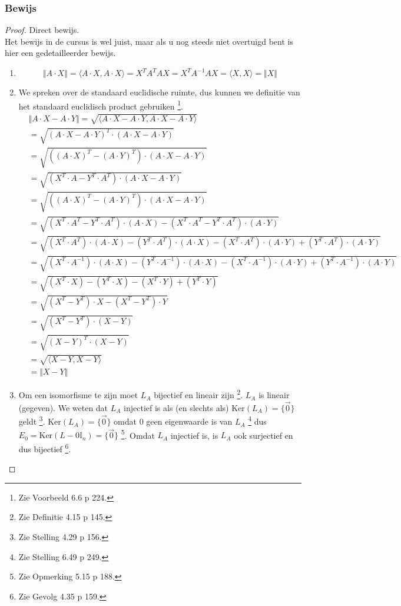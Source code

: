 \documentclass[lineaire_algebra_oplossingen.tex]{subfiles}
\begin{document}
\subsubsection*{Bewijs}
\begin{proof}
Direct bewijs.\\
Het bewijs in de cursus is wel juist, maar als u nog steeds niet overtuigd bent is hier een gedetailleerder bewijs.
\begin{enumerate}
\item
\[
\Vert A \cdot X \Vert = \langle A\cdot X, A\cdot X\rangle = X^TA^TAX =  X^TA^{-1}AX =\langle X,X\rangle = \Vert X\Vert
\]

\item
We spreken over de standaard euclidische ruimte, dus kunnen we definitie van het standaard euclidisch product gebruiken \footnote{Zie Voorbeeld 6.6 p 224.}.
\begin{align*}
&\Vert A\cdot X - A\cdot Y \Vert
= \sqrt{\langle  A\cdot X - A\cdot Y ,  A\cdot X - A\cdot Y \rangle} \\
&= \sqrt{(A\cdot X - A\cdot Y)^T\cdot(A\cdot X - A\cdot Y)} \\
&= \sqrt{((A\cdot X)^T - (A\cdot Y)^T)\cdot(A\cdot X - A\cdot Y)} \\
&= \sqrt{(X^T\cdot A - Y^T\cdot A^T)\cdot(A\cdot X - A\cdot Y)} \\
&= \sqrt{((A\cdot X)^T - (A\cdot Y)^T)\cdot(A\cdot X - A\cdot Y)}  \\
&= \sqrt{(X^T\cdot A^T - Y^T\cdot A^T)\cdot(A\cdot X) - (X^T\cdot A^T - Y^T\cdot A^T)\cdot (A\cdot Y)} \\
&= \sqrt{(X^T\cdot A^T)\cdot(A\cdot X) - (Y^T\cdot A^T)\cdot(A\cdot X) - (X^T\cdot A^T)\cdot (A\cdot Y) + (Y^T\cdot A^T)\cdot (A\cdot Y)} \\
&= \sqrt{(X^T\cdot A^{-1})\cdot(A\cdot X) - (Y^T\cdot A^{-1})\cdot(A\cdot X) - (X^T\cdot A^{-1})\cdot (A\cdot Y) + (Y^T\cdot A^{-1})\cdot (A\cdot Y)} \\
&= \sqrt{(X^T\cdot X) - (Y^T\cdot X) - (X^T\cdot Y) + (Y^T\cdot Y)} \\
&= \sqrt{(X^T- Y^T)\cdot X - (X^T - Y^T) \cdot Y} \\
&= \sqrt{(X^T- Y^T)\cdot (X - Y)} \\
&= \sqrt{(X- Y)^T\cdot (X - Y)} \\
&= \sqrt{\langle X-Y , X-Y \rangle} \\
&= \Vert X-Y\Vert
\end{align*}

\item
Om een isomorfisme te zijn moet $L_A$ bijectief en lineair zijn \footnote{Zie Definitie 4.15 p 145.}. $L_A$ is lineair (gegeven). We weten dat $L_A$ injectief is als (en slechts als) $\text{Ker}(L_A) = \{\vec{0}\}$ geldt \footnote{Zie Stelling 4.29 p 156.}. $\text{Ker}(L_A) = \{\vec{0}\}$ omdat $0$ geen eigenwaarde is van $L_A$ \footnote{Zie Stelling 6.49 p 249.} dus $E_0 = \text{Ker}(L - 0\mathbb{I}_n) = \{\vec{0}\}$ \footnote{Zie Opmerking 5.15 p 188.}. Omdat $L_A$ injectief is, is $L_A$ ook surjectief en dus bijectief \footnote{Zie Gevolg 4.35 p 159.}.


\end{enumerate}
\end{proof}
\end{document}
